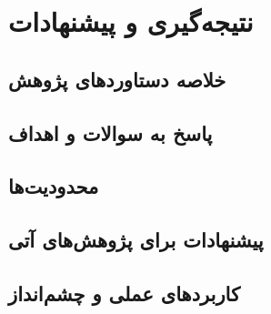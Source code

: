 

\chapter{نتیجه‌گیری و پیشنهادات} %
\label{ch:conclusion-suggestions}

\section{خلاصه دستاوردهای پژوهش} %
\label{sec:research-achievements-summary}

\section{پاسخ به سوالات و اهداف} %
\label{sec:answers-to-questions-goals}

\section{محدودیت‌ها} %
\label{sec:limitations}

\section{پیشنهادات برای پژوهش‌های آتی} %
\label{sec:future-research-suggestions}

\section{کاربردهای عملی و چشم‌انداز} %
\label{sec:practical-applications-outlook}
